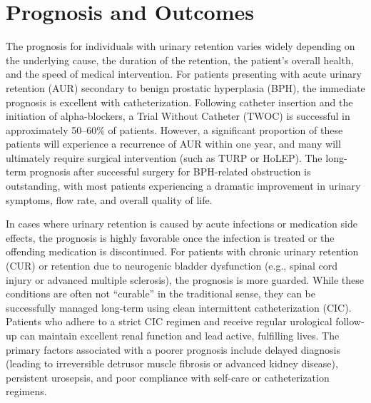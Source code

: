 \section*{Prognosis and Outcomes}
The prognosis for individuals with urinary retention varies widely depending on the underlying cause, the duration of the retention, the patient's overall health, and the speed of medical intervention. For patients presenting with acute urinary retention (AUR) secondary to benign prostatic hyperplasia (BPH), the immediate prognosis is excellent with catheterization. Following catheter insertion and the initiation of alpha-blockers, a Trial Without Catheter (TWOC) is successful in approximately 50--60\% of patients. However, a significant proportion of these patients will experience a recurrence of AUR within one year, and many will ultimately require surgical intervention (such as TURP or HoLEP). The long-term prognosis after successful surgery for BPH-related obstruction is outstanding, with most patients experiencing a dramatic improvement in urinary symptoms, flow rate, and overall quality of life.

In cases where urinary retention is caused by acute infections or medication side effects, the prognosis is highly favorable once the infection is treated or the offending medication is discontinued. For patients with chronic urinary retention (CUR) or retention due to neurogenic bladder dysfunction (e.g., spinal cord injury or advanced multiple sclerosis), the prognosis is more guarded. While these conditions are often not ``curable'' in the traditional sense, they can be successfully managed long-term using clean intermittent catheterization (CIC). Patients who adhere to a strict CIC regimen and receive regular urological follow-up can maintain excellent renal function and lead active, fulfilling lives. The primary factors associated with a poorer prognosis include delayed diagnosis (leading to irreversible detrusor muscle fibrosis or advanced kidney disease), persistent urosepsis, and poor compliance with self-care or catheterization regimens.

